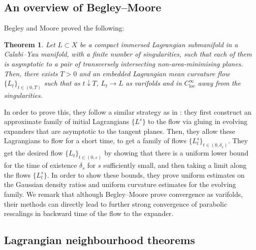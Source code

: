 \documentclass[10pt, a4paper]{article}
\theoremstyle{plain}%
\newtheorem{theorem}{Theorem}[section]
\theoremstyle{definition}
\numberwithin{figure}{section}
\numberwithin{equation}{section}
\newcommand{\rt}{\rightarrow}
\begin{document}
\subsection{An overview of Begley--Moore}

Begley and Moore \cite{BM16} proved the following:
\begin{theorem}
	Let $L\subset X$ be a compact immersed Lagrangian submanifold in a Calabi--Yau manifold, with a finite number of singularities, such that each of them is asymptotic to a pair of transversely intersecting non-area-minimising planes. Then, there exists $T>0$ and an embedded Lagrangian mean curvature flow $\{L_t\}_{t\in (0,T)}$ such that as $t\downarrow T$, $ L_t\rt L$ as varifolds and in $C^\infty_{\mathrm{loc}}$ away from the singularities.
\end{theorem}

In order to prove this, they follow a similar strategy as in \cite{INS19}: they first construct an approximate family of initial Lagrangians $\{L^s\}$  to the flow via gluing in evolving expanders that are asymptotic to the tangent planes. Then, they allow these Lagrangians to flow for a short time, to get a family of flows $\{L^s_t\}_{t\in(0,\delta_s)}$. They get the desired flow $\{L_t\}_{t\in(0,\varepsilon)}$ by showing that there is a uniform lower bound for the time of existence $\delta_s$ for $s$ sufficiently small, and then taking a limit along the flows $\{L^s_t\}$. In order to show these bounds, they prove uniform estimates on the Gaussian density ratios and uniform curvature estimates for the evolving family. We remark that although Begley--Moore prove convergence as varifolds, their methods can directly lead to further strong convergence of parabolic rescalings in backward time of the flow to the expander.



\subsection{Lagrangian neighbourhood theorems}
\end{document}
